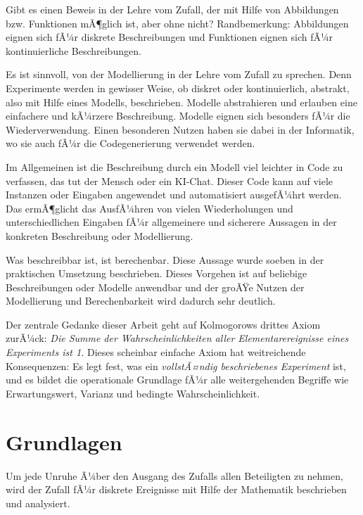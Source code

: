 ﻿\documentclass[12pt,a4paper]{article}
\theoremstyle{definition}
\theoremstyle{plain}
\theoremstyle{remark}
\begin{document}
Gibt es einen Beweis in der Lehre vom Zufall, der mit Hilfe von Abbildungen bzw. Funktionen mÃ¶glich ist, aber ohne nicht? Randbemerkung: Abbildungen eignen sich fÃ¼r diskrete Beschreibungen und Funktionen eignen sich fÃ¼r kontinuierliche Beschreibungen. 

Es ist sinnvoll, von der Modellierung in der Lehre vom Zufall zu sprechen. Denn Experimente werden in gewisser Weise, ob diskret oder kontinuierlich, abstrakt, also mit Hilfe eines Modells, beschrieben. Modelle abstrahieren und erlauben eine einfachere und kÃ¼rzere Beschreibung. Modelle eignen sich besonders fÃ¼r die Wiederverwendung. Einen besonderen Nutzen haben sie dabei in der Informatik, wo sie auch fÃ¼r die Codegenerierung verwendet werden. 

Im Allgemeinen ist die Beschreibung durch ein Modell viel leichter in Code zu verfassen, das tut der Mensch oder ein KI-Chat. Dieser Code kann auf viele Instanzen oder Eingaben angewendet und automatisiert ausgefÃ¼hrt werden. Das ermÃ¶glicht das AusfÃ¼hren von vielen Wiederholungen und unterschiedlichen Eingaben fÃ¼r allgemeinere und sicherere Aussagen in der konkreten Beschreibung oder Modellierung.

Was beschreibbar ist, ist berechenbar. Diese Aussage wurde soeben in der praktischen Umsetzung beschrieben. Dieses Vorgehen ist auf beliebige Beschreibungen oder Modelle anwendbar und der groÃŸe Nutzen der Modellierung und Berechenbarkeit wird dadurch sehr deutlich.

Der zentrale Gedanke dieser Arbeit geht auf Kolmogorows drittes Axiom
zurÃ¼ck: \emph{Die Summe der Wahrscheinlichkeiten aller Elementarereignisse
eines Experiments ist 1.} Dieses scheinbar einfache Axiom hat weitreichende
Konsequenzen: Es legt fest, was ein \emph{vollstÃ¤ndig beschriebenes Experiment}
ist, und es bildet die operationale Grundlage fÃ¼r alle weitergehenden Begriffe
wie Erwartungswert, Varianz und bedingte Wahrscheinlichkeit.

\section{Grundlagen}
\label{sec:grundlagen}

Um jede Unruhe Ã¼ber den Ausgang des Zufalls allen Beteiligten zu nehmen, wird
der Zufall fÃ¼r diskrete Ereignisse mit Hilfe der Mathematik beschrieben und
analysiert.
\end{document}
